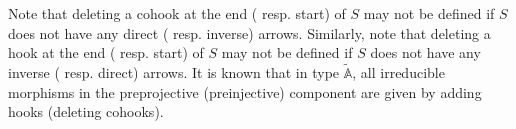\documentclass[12pt]{amsart}
\theoremstyle{plain}
\theoremstyle{definition}
\newtheorem{exmp}{Example}
    [section]
\theoremstyle{remark}
\begin{document}

 Note that deleting a cohook at the end ({\color{black} resp.} start) of $S$ may not be defined if $S$ does not have any direct ({\color{black} resp.} inverse) arrows. Similarly, note that deleting a hook at the end ({\color{black} resp.} start) of $S$ may not be defined if $S$ does not have any inverse ({\color{black} resp.} direct) arrows. It is known that in type $\tilde{\mathbb{A}}$, all irreducible morphisms in the preprojective (preinjective) component are given by adding hooks (deleting cohooks).  
 
\end{document}
